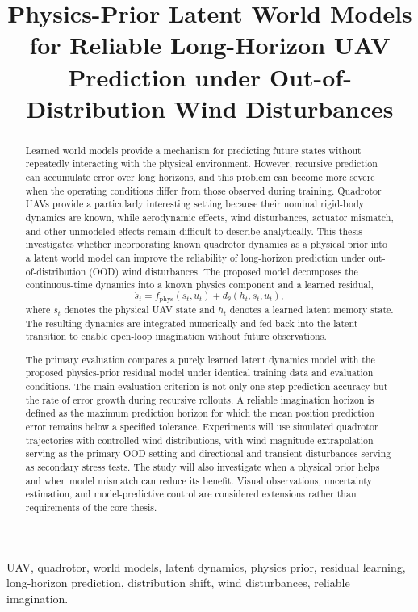 \documentclass[conference]{IEEEtran}
\title{Physics-Prior Latent World Models for Reliable Long-Horizon UAV Prediction under Out-of-Distribution Wind Disturbances}
\author{
\IEEEauthorblockN{CHETHAN}
\IEEEauthorblockA{
Department of Computational \& Data Sciences\\
Indian Institute of Science\\
Email: chethan1@iisc.ac.in}
}
\begin{document}
\maketitle


\begin{abstract} Learned world models provide a mechanism for predicting future states
without repeatedly interacting with the physical environment. However,
recursive prediction can accumulate error over long horizons, and this
problem can become more severe when the operating conditions differ from
those observed during training. Quadrotor UAVs provide a particularly
interesting setting because their nominal rigid-body dynamics are known,
while aerodynamic effects, wind disturbances, actuator mismatch, and
other unmodeled effects remain difficult to describe analytically. This thesis investigates whether incorporating known quadrotor dynamics
as a physical prior into a latent world model can improve the reliability of long-horizon prediction under out-of-distribution (OOD) wind
disturbances. The proposed model decomposes the continuous-time dynamics into a known physics component and a learned residual,
\[
\dot{s}_t =
f_{\mathrm{phys}}(s_t,u_t)
+
d_{\theta}(h_t,s_t,u_t),
\]
where $s_t$ denotes the physical UAV state and $h_t$ denotes a learned
latent memory state. The resulting dynamics are integrated numerically
and fed back into the latent transition to enable open-loop imagination
without future observations.

The primary evaluation compares a purely learned latent dynamics model
with the proposed physics-prior residual model under identical training
data and evaluation conditions. The main evaluation criterion is not
only one-step prediction accuracy but the rate of error growth during
recursive rollouts. A reliable imagination horizon is defined as the
maximum prediction horizon for which the mean position prediction error
remains below a specified tolerance. Experiments will use simulated
quadrotor trajectories with controlled wind distributions, with wind
magnitude extrapolation serving as the primary OOD setting and
directional and transient disturbances serving as secondary stress
tests. The study will also investigate when a physical prior helps and
when model mismatch can reduce its benefit. Visual observations, uncertainty estimation, and model-predictive control are considered extensions rather than requirements of the core thesis.
\end{abstract}

\begin{IEEEkeywords}
UAV, quadrotor, world models, latent dynamics, physics prior,
residual learning, long-horizon prediction, distribution shift,
wind disturbances, reliable imagination.
\end{IEEEkeywords}
\end{document}
